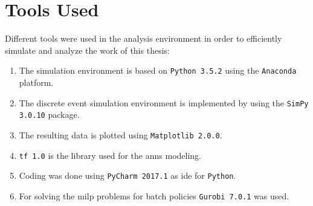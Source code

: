 \chapter{Tools Used}

Different tools were used in the analysis environment in order to efficiently simulate and analyze the work of this thesis:

\begin{enumerate}
	\item The simulation environment is based on \texttt{Python 3.5.2} using the \texttt{Anaconda} platform.
	\item The discrete event simulation environment is implemented by using the \texttt{SimPy 3.0.10} package.
	\item The resulting data is plotted using \texttt{Matplotlib 2.0.0}.
	\item \texttt{\gls{tf} 1.0} is the library used for the \glspl{ann} modeling.
	\item Coding was done using \texttt{PyCharm 2017.1} as \gls{ide} for \texttt{Python}.
	\item For solving the \gls{milp} problems for batch policies \texttt{Gurobi 7.0.1} was used.
\end{enumerate}